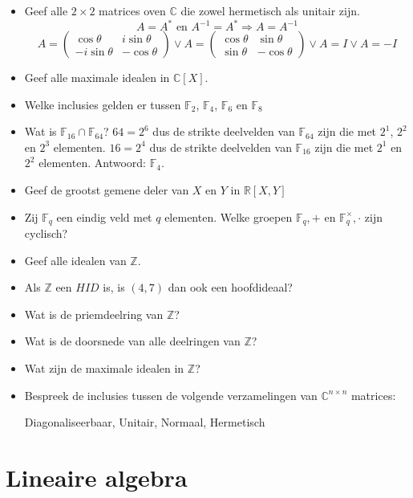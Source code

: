 \documentclass[main.tex]{subfiles}
\begin{document}
\begin{itemize}
\item Geef alle $2\times 2$ matrices oven $\mathbb{C}$ die zowel hermetisch als unitair zijn.
\[ A = A^{*} \text{ en } A^{-1}=A^{*} \Rightarrow A=A^{-1}\]
\[ A = 
\begin{pmatrix}
  \cos\theta & i\sin\theta\\
  -i\sin\theta & -\cos\theta
\end{pmatrix}
\vee 
A =
\begin{pmatrix}
  \cos\theta & \sin\theta\\
  \sin\theta & -\cos\theta
\end{pmatrix}
\vee 
A = I
\vee 
A = -I
\]
\item Geef alle maximale idealen in $\mathbb{C}[X]$.
\item Welke inclusies gelden er tussen $\mathbb{F}_{2}$, $\mathbb{F}_{4}$, $\mathbb{F}_{6}$ en $\mathbb{F}_{8}$
\item Wat is $\mathbb{F}_{16}\cap \mathbb{F}_{64}$?
$64=2^{6}$ dus de strikte deelvelden van $\mathbb{F}_{64}$ zijn die met $2^{1}$, $2^{2}$ en $2^{3}$ elementen.
$16=2^{4}$ dus de strikte deelvelden van $\mathbb{F}_{16}$ zijn die met $2^{1}$ en $2^{2}$ elementen.
Antwoord: $\mathbb{F}_{4}$.
\item Geef de grootst gemene deler van $X$ en $Y$ in $\mathbb{R}[X,Y]$
\item Zij $\mathbb{F}_{q}$ een eindig veld met $q$ elementen.
  Welke groepen $\mathbb{F}_{q},+$ en $\mathbb{F}_{q}^{\times},\cdot$ zijn cyclisch?
\item Geef alle idealen van $\mathbb{Z}$.
\item Als $\mathbb{Z}$ een $HID$ is, is $(4,7)$ dan ook een hoofdideaal?
\item Wat is de priemdeelring van $\mathbb{Z}$?
\item Wat is de doorsnede van alle deelringen van $\mathbb{Z}$?
\item Wat zijn de maximale idealen in $\mathbb{Z}$?
\item Bespreek de inclusies tussen de volgende verzamelingen van $\mathbb{C}^{n \times n}$ matrices:
  \begin{center}
    Diagonaliseerbaar, Unitair, Normaal, Hermetisch
  \end{center}
\end{itemize}

\section{Lineaire algebra}
\label{sec:lineaire-algebra}
\end{document}
